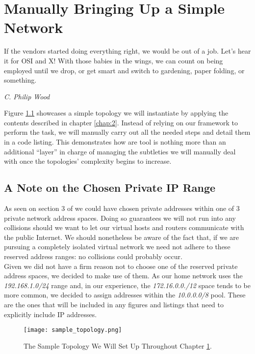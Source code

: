 \chapter{Manually Bringing Up a Simple Network} \label{chap:3}
    \epigraph{If the vendors started doing everything right, we would be out of a job.
    Let's hear it for OSI and X!  With those babies in the wings, we can count
    on being employed until we drop, or get smart and switch to gardening,
    paper folding, or something.}{\textit{C. Philip Wood}}

    Figure \ref{fig:sample-topology} showcases a simple topology we will instantiate by applying the contents described in chapter \ref{chap:2}. Instead of relying on our framework to perform the task, we will manually carry out all the needed steps and detail them in a code listing. This demonstrates how are tool is nothing more than an additional ``layer'' in charge of managing the subtleties we will manually deal with once the topologies' complexity begins to increase.\\

    \section{A Note on the Chosen Private IP Range}
        As seen on section $3$ of \cite{bib:rfc1918} we could have chosen private addresses within one of $3$ private network address spaces. Doing so guarantees we will not run into any collisions should we want to let our virtual hosts and routers communicate with the public Internet. We should nonetheless be aware of the fact that, if we are pursuing a completely isolated virtual network we need not adhere to these reserved address ranges: no collisions could probably occur.\\

        Given we did not have a firm reason not to choose one of the reserved private address spaces, we decided to make use of them. As our home network uses the \textit{192.168.1.0/24} range and, in our experience, the \textit{172.16.0.0./12} space tends to be more common, we decided to assign addresses within the \textit{10.0.0.0/8} pool. These are the ones that will be included in any figures and listings that need to explicitly include IP addresses.\\

    \begin{figure}
        \centering
        \texttt{[image: sample\_topology.png]}
        \caption[A Sample Topology]{The Sample Topology We Will Set Up Throughout Chapter \ref{chap:3}.}
        \label{fig:sample-topology}
    \end{figure}

